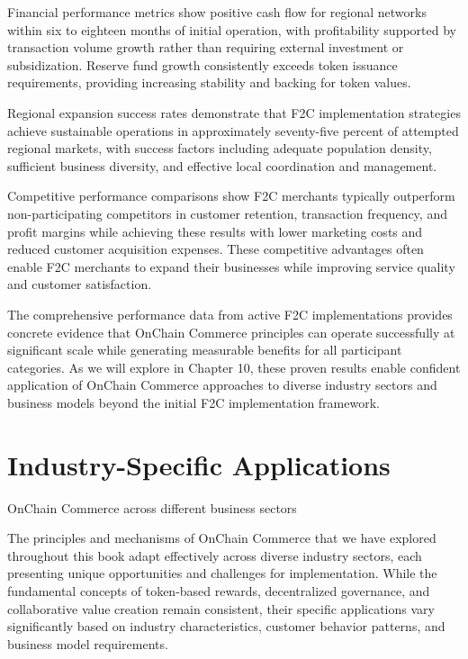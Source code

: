 \documentclass[
  Letterpaper,
]{scrbook}
\begin{document}
Financial performance metrics show positive cash flow for regional
networks within six to eighteen months of initial operation, with
profitability supported by transaction volume growth rather than
requiring external investment or subsidization. Reserve fund growth
consistently exceeds token issuance requirements, providing increasing
stability and backing for token values.

Regional expansion success rates demonstrate that F2C implementation
strategies achieve sustainable operations in approximately seventy-five
percent of attempted regional markets, with success factors including
adequate population density, sufficient business diversity, and
effective local coordination and management.

Competitive performance comparisons show F2C merchants typically
outperform non-participating competitors in customer retention,
transaction frequency, and profit margins while achieving these results
with lower marketing costs and reduced customer acquisition expenses.
These competitive advantages often enable F2C merchants to expand their
businesses while improving service quality and customer satisfaction.

The comprehensive performance data from active F2C implementations
provides concrete evidence that OnChain Commerce principles can operate
successfully at significant scale while generating measurable benefits
for all participant categories. As we will explore in Chapter 10, these
proven results enable confident application of OnChain Commerce
approaches to diverse industry sectors and business models beyond the
initial F2C implementation framework.

\chapter{Industry-Specific
Applications}\label{sec-industry-applications}

OnChain Commerce across different business sectors

The principles and mechanisms of OnChain Commerce that we have explored
throughout this book adapt effectively across diverse industry sectors,
each presenting unique opportunities and challenges for implementation.
While the fundamental concepts of token-based rewards, decentralized
governance, and collaborative value creation remain consistent, their
specific applications vary significantly based on industry
characteristics, customer behavior patterns, and business model
requirements.
\end{document}
